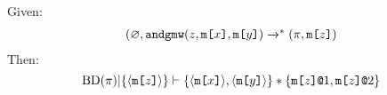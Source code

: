 \begin{comment}
\begin{lemma}
  Given:
  $$
  \begin{array}{c}
  (\varnothing,\decodegmw(\andgmw(z,\flip{x},\flip{y})) \redxs \\
  (\prog_1,\decodegmw(\mesg{z})) \redxs (\prog_2,())
  \end{array}
  $$
  Define:
  \begin{mathpar}
    X \defeq
    \{ \elab{\flip{x}}{2}, \elab{\flip{y}}{1}, \elab{\flip{y}}{2}, \rvl{1}, \rvl{2} \}

    O \defeq  \{ \out{1}, \out{2} \}
  \end{mathpar}
  Then:
  $$
  \sep{\progtt(\prog_1)}{\{ \elab{\mesg{z}}{2} \}}{\{ \elab{\flip{x}}{1}, \elab{\flip{y}}{1}\}}
  $$
  and:
  $$
  \margd{\progtt(\prog_2)}{(\{ \elab{\flip{x}}{1} \}|\store_{X \cup O})} =
    \margd{\progtt(\prog_2)}{(\{ \elab{\flip{x}}{1} \}|\store_O)}
  $$
\end{lemma}

\begin{lemma}
  Given:
  $$
  \begin{array}{c}
  (\varnothing,\decodegmw(\andgmw(z,\flip{x},\flip{y})) \redxs \\
  (\prog_1,\decodegmw(\mesg{z})) \redxs (\prog_2,())
  \end{array}
  $$
  Define:
  \begin{mathpar}
    X \defeq
    \{ \elab{\flip{x}}{2}, \elab{\flip{y}}{1}, \elab{\flip{y}}{2}, \rvl{1}, \rvl{2} \}

    O \defeq  \{ \out{1}, \out{2} \}
  \end{mathpar}
  Then:
  $$
  \begin{array}{c}
    \margd{\progtt(\prog_2)}{(\cod{\store(\elab{\flip{x}}{1})\ \exor\ \store(\elab{\flip{x}}{2})}|\store_{X \cup O})} =\\
    \margd{\progtt(\prog_2)}{(\cod{\store(\elab{\flip{x}}{1})\ \exor\ \store(\elab{\flip{x}}{2})}|\store_O)}
  \end{array}
  $$
  $$
  \sep{\progtt(\prog_2)}{(\cod{\store(\elab{\flip{x}}{1})\ \exor\ \store(\elab{\flip{x}}{2})}) \cup O}{X}
  $$
  $$
  \sep{\progtt(\prog_2)}{\{ \macgv{x} \} \cup O}{X}
  $$
\end{lemma}
\end{comment}

\begin{lemma}
  Given:
  $$
  \begin{array}{c}
  (\varnothing,\andgmw(z,\mesg{x},\mesg{y}) \redxs %
  (\prog,\mesg{z})
  \end{array}
  $$
  Then:
  $$
  \mathrm{BD}(\pi)|\{ \langle \texttt{m[}z\texttt{]} \rangle \} \vdash \{ \langle \texttt{m[}x\texttt{]} \rangle,\langle \texttt{m[}y\texttt{]} \rangle \} * \{ \texttt{m[}z\texttt{]}\texttt{@}1,\texttt{m[}z\texttt{]}\texttt{@}2 \}
  $$
\end{lemma}

